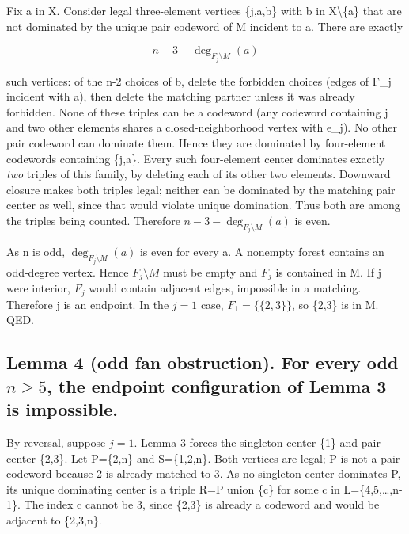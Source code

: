 \documentclass[
  11pt,
]{article}
\begin{document}
Fix a in X. Consider legal three-element vertices \{j,a,b\} with b in
X\textbackslash\{a\} that are not dominated by the unique pair codeword
of M incident to a. There are exactly

\[n-3-\deg_{F_j\setminus M}(a)\]

such vertices: of the n-2 choices of b, delete the forbidden choices
(edges of F\_j incident with a), then delete the matching partner unless
it was already forbidden. None of these triples can be a codeword (any
codeword containing j and two other elements shares a
closed-neighborhood vertex with e\_j). No other pair codeword can
dominate them. Hence they are dominated by four-element codewords
containing \{j,a\}. Every such four-element center dominates exactly
\emph{two} triples of this family, by deleting each of its other two
elements. Downward closure makes both triples legal; neither can be
dominated by the matching pair center as well, since that would violate
unique domination. Thus both are among the triples being counted.
Therefore \(n-3-\deg_{F_j\setminus M}(a)\) is even.

As n is odd, \(\deg_{F_j\setminus M}(a)\) is even for every a. A
nonempty forest contains an odd-degree vertex. Hence \(F_j\setminus M\)
must be empty and \(F_j\) is contained in M. If j were interior, \(F_j\)
would contain adjacent edges, impossible in a matching. Therefore j is
an endpoint. In the \(j=1\) case, \(F_1=\{\{2,3\}\}\), so \{2,3\} is in
M. QED.

\subsection{\texorpdfstring{Lemma 4 (odd fan obstruction). For every odd
\(n\ge 5\), the endpoint configuration of Lemma 3 is
impossible.}{Lemma 4 (odd fan obstruction). For every odd n\textbackslash ge 5, the endpoint configuration of Lemma 3 is impossible.}}\label{lemma-4-odd-fan-obstruction.-for-every-odd-nge-5-the-endpoint-configuration-of-lemma-3-is-impossible.}

By reversal, suppose \(j=1\). Lemma 3 forces the singleton center \{1\}
and pair center \{2,3\}. Let P=\{2,n\} and S=\{1,2,n\}. Both vertices
are legal; P is not a pair codeword because 2 is already matched to 3.
As no singleton center dominates P, its unique dominating center is a
triple R=P union \{c\} for some c in L=\{4,5,\ldots,n-1\}. The index c
cannot be 3, since \{2,3\} is already a codeword and would be adjacent
to \{2,3,n\}.
\end{document}
